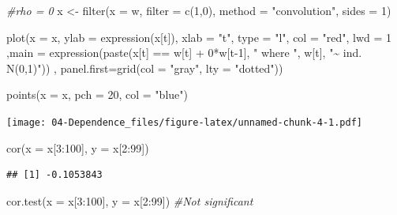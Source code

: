 \documentclass[
]{book}
\newenvironment{Shaded}{\begin{snugshade}}{\end{snugshade}}
\newcommand{\AttributeTok}[1]{\textcolor[rgb]{0.77,0.63,0.00}{#1}}
\newcommand{\CommentTok}[1]{\textcolor[rgb]{0.56,0.35,0.01}{\textit{#1}}}
\newcommand{\DecValTok}[1]{\textcolor[rgb]{0.00,0.00,0.81}{#1}}
\newcommand{\FunctionTok}[1]{\textcolor[rgb]{0.00,0.00,0.00}{#1}}
\newcommand{\NormalTok}[1]{#1}
\newcommand{\OtherTok}[1]{\textcolor[rgb]{0.56,0.35,0.01}{#1}}
\newcommand{\SpecialCharTok}[1]{\textcolor[rgb]{0.00,0.00,0.00}{#1}}
\newcommand{\StringTok}[1]{\textcolor[rgb]{0.31,0.60,0.02}{#1}}
\theoremstyle{definition}
\theoremstyle{definition}
\theoremstyle{definition}
\theoremstyle{definition}
\theoremstyle{remark}
\begin{document}
\begin{Shaded}
\begin{Highlighting}[]
\CommentTok{\#rho = 0}
\NormalTok{x }\OtherTok{\textless{}{-}} \FunctionTok{filter}\NormalTok{(}\AttributeTok{x =}\NormalTok{ w, }\AttributeTok{filter =} \FunctionTok{c}\NormalTok{(}\DecValTok{1}\NormalTok{,}\DecValTok{0}\NormalTok{), }\AttributeTok{method =} \StringTok{"convolution"}\NormalTok{, }\AttributeTok{sides =} \DecValTok{1}\NormalTok{)}

\FunctionTok{plot}\NormalTok{(}\AttributeTok{x =}\NormalTok{ x, }\AttributeTok{ylab =} \FunctionTok{expression}\NormalTok{(x[t]), }\AttributeTok{xlab =} \StringTok{"t"}\NormalTok{, }\AttributeTok{type =} \StringTok{"l"}\NormalTok{, }\AttributeTok{col =} \StringTok{"red"}\NormalTok{, }\AttributeTok{lwd =} \DecValTok{1}\NormalTok{ ,}\AttributeTok{main =} \FunctionTok{expression}\NormalTok{(}\FunctionTok{paste}\NormalTok{(x[t] }\SpecialCharTok{==}\NormalTok{ w[t] }\SpecialCharTok{+} \DecValTok{0}\SpecialCharTok{*}\NormalTok{w[t}\DecValTok{{-}1}\NormalTok{], }\StringTok{" where "}\NormalTok{, w[t], }\StringTok{"\textasciitilde{} ind. N(0,1)"}\NormalTok{)) , }\AttributeTok{panel.first=}\FunctionTok{grid}\NormalTok{(}\AttributeTok{col =} \StringTok{"gray"}\NormalTok{, }\AttributeTok{lty =} \StringTok{"dotted"}\NormalTok{))}

\FunctionTok{points}\NormalTok{(}\AttributeTok{x =}\NormalTok{ x, }\AttributeTok{pch =} \DecValTok{20}\NormalTok{, }\AttributeTok{col =} \StringTok{"blue"}\NormalTok{)}
\end{Highlighting}
\end{Shaded}

\texttt{[image: 04-Dependence\_files/figure-latex/unnamed-chunk-4-1.pdf]}

\begin{Shaded}
\begin{Highlighting}[]
\FunctionTok{cor}\NormalTok{(}\AttributeTok{x =}\NormalTok{ x[}\DecValTok{3}\SpecialCharTok{:}\DecValTok{100}\NormalTok{], }\AttributeTok{y =}\NormalTok{ x[}\DecValTok{2}\SpecialCharTok{:}\DecValTok{99}\NormalTok{]) }
\end{Highlighting}
\end{Shaded}

\begin{verbatim}
## [1] -0.1053843
\end{verbatim}

\begin{Shaded}
\begin{Highlighting}[]
\FunctionTok{cor.test}\NormalTok{(}\AttributeTok{x =}\NormalTok{ x[}\DecValTok{3}\SpecialCharTok{:}\DecValTok{100}\NormalTok{], }\AttributeTok{y =}\NormalTok{ x[}\DecValTok{2}\SpecialCharTok{:}\DecValTok{99}\NormalTok{]) }\CommentTok{\#Not significant }
\end{Highlighting}
\end{Shaded}
\end{document}
